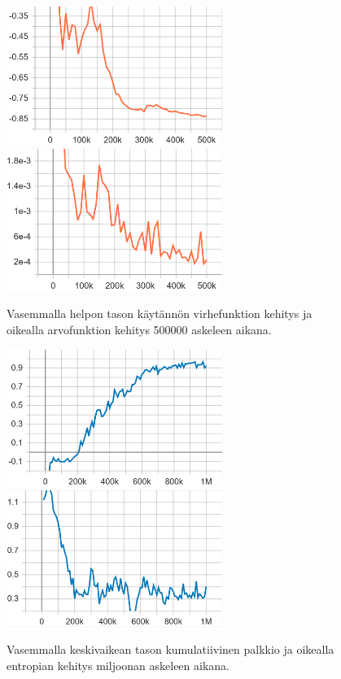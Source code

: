 \documentclass[utf8]{gradu3}
\begin{document}
\begin{figure}[h]
\includegraphics[width=7cm]{B_Policy_Loss.png}
\includegraphics[width=7cm]{B_Value_Loss.png}
\caption{Vasemmalla helpon tason käytännön virhefunktion kehitys ja oikealla arvofunktion kehitys 500000 askeleen aikana.}
\label{beginnerloss}
\end{figure}

\begin{figure}[h]
\includegraphics[width=7cm]{I_Cumulative_Reward.png}
\includegraphics[width=7cm]{I_Policy_Entropy.png}
\caption{Vasemmalla keskivaikean tason kumulatiivinen palkkio ja oikealla entropian kehitys miljoonan askeleen aikana.}
\label{intermediatecumulativeentropy}
\end{figure}
\end{document}

